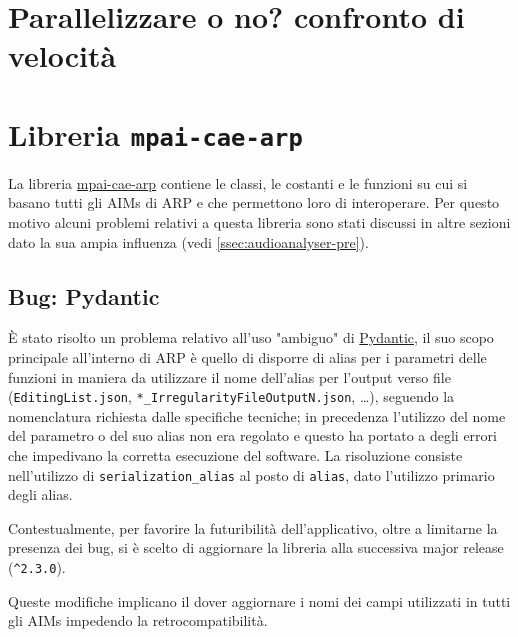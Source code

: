 \section{Parallelizzare o no? confronto di velocità} \label{sec:parallelizzazione}





\section{Libreria \texttt{mpai-cae-arp}} \label{sec:lib-mpaicaearp} %
La libreria \href{https://pypi.org/project/mpai-cae-arp/}{mpai-cae-arp} contiene le classi, le costanti e le funzioni su cui si basano tutti gli \acp{AIM} di \ac{ARP} e che permettono loro di interoperare.
Per questo motivo alcuni problemi relativi a questa libreria sono stati discussi in altre sezioni dato la sua ampia influenza (vedi \ref{ssec:audioanalyser-pre}).


\subsection{Bug: Pydantic} \label{ssec:mpaicaearp-pydantic}    %
È stato risolto un problema relativo all'uso "ambiguo" di \href{https://docs.pydantic.dev/1.10/}{Pydantic}, il suo scopo principale all'interno di \ac{ARP} è quello di disporre di alias per i parametri delle funzioni in maniera da utilizzare il nome dell'alias per l'output verso file (\texttt{EditingList.json}, \verb|*_IrregularityFileOutputN.json|, \dots), seguendo la nomenclatura richiesta dalle specifiche tecniche; in precedenza l'utilizzo del nome del parametro o del suo alias non era regolato e questo ha portato a degli errori che impedivano la corretta esecuzione del software.
La risoluzione consiste nell'utilizzo di \verb|serialization_alias| al posto di \texttt{alias}, dato l'utilizzo primario degli alias.

Contestualmente, per favorire la futuribilità dell'applicativo, oltre a limitarne la presenza dei bug, si è scelto di aggiornare la libreria alla successiva major release (\verb|^2.3.0|).

Queste modifiche implicano il dover aggiornare i nomi dei campi utilizzati in tutti gli \acp{AIM} impedendo la retrocompatibilità.


